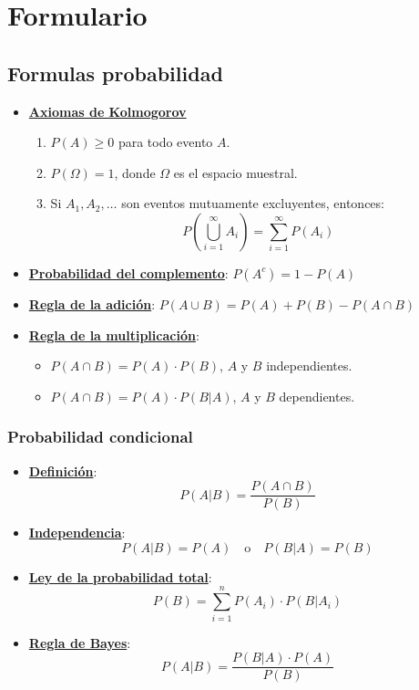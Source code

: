 \section{Formulario}

\subsection{Formulas probabilidad}
\begin{itemize}
    \item \hyperref[sec:axiomasKolmogorov]{\textbf{Axiomas de Kolmogorov}}

    \begin{enumerate}
        \item $P(A) \geq 0$ para todo evento $A$. 
        \item $P(\Omega) = 1$, donde $\Omega$ es el espacio muestral. 
        \item Si $A_1, A_2, \ldots$ son eventos mutuamente excluyentes, entonces:
        \[
          P\left(\bigcup_{i=1}^{\infty} A_i\right) = \sum_{i=1}^{\infty} P(A_i)
        \]
    \end{enumerate}

    \item \hyperref[sec:probComplemento]{\textbf{Probabilidad del complemento}}:
    $P(A^c) = 1 - P(A)$

    \item \hyperref[sec:reglaAdicion]{\textbf{Regla de la adición}}: 
    $P(A \cup B) = P(A) + P(B) - P(A \cap B)$

    \item \hyperref[sec:reglaMultiplicacion]{\textbf{Regla de la multiplicación}}:
    \begin{itemize}
      \item $P(A \cap B) = P(A) \cdot P(B)$, $A$ y $B$ independientes.
      \item $P(A \cap B) = P(A) \cdot P(B|A)$, $A$ y $B$ dependientes.
    \end{itemize}
\end{itemize}

\subsubsection{Probabilidad condicional}
\begin{itemize}
    \item \hyperref[sec:probabilidadCondicional]{\textbf{Definición}}: $$P(A|B) = \frac{P(A \cap B)}{P(B)}$$

    \item \hyperref[sec:independencia]{\textbf{Independencia}}: $$P(A|B) = P(A) \quad \text{o} \quad P(B|A) = P(B)$$

    \item \hyperref[sec:leyProbTotal]{\textbf{Ley de la probabilidad total}}: $$P(B) = \sum_{i=1}^{n} P(A_i) \cdot P(B|A_i)$$

    \item \hyperref[sec:reglaBayes]{\textbf{Regla de Bayes}}: $$P(A|B) = \frac{P(B|A) \cdot P(A)}{P(B)}$$
\end{itemize}


